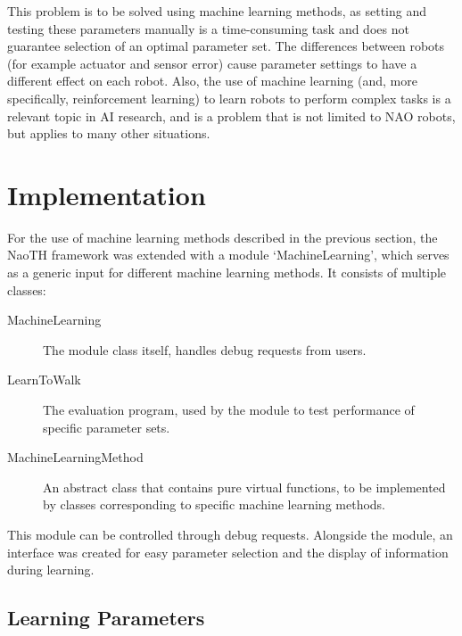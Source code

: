 \documentclass{article}
\begin{document}
This problem is to be solved using machine learning methods, as setting and testing these parameters manually is a time-consuming task and does not guarantee selection of an optimal parameter set. The differences between robots (for example actuator and sensor error) cause parameter settings to have a different effect on each robot. Also, the use of machine learning (and, more specifically, reinforcement learning) to learn robots to perform complex tasks is a relevant topic in AI research, and is a problem that is not limited to NAO robots, but applies to many other situations. 


\section{Implementation}
For the use of machine learning methods described in the previous section, the NaoTH framework was extended with a module `MachineLearning', which serves as a generic input for different machine learning methods. It consists of multiple classes:

\begin{description}
\item[MachineLearning] The module class itself, handles debug requests from users.
\item[LearnToWalk] The evaluation program, used by the module to test performance of specific parameter sets.
\item[MachineLearningMethod] An abstract class that contains pure virtual functions, to be implemented by classes corresponding to specific machine learning methods.
\end{description}

This module can be controlled through debug requests. Alongside the module, an interface was created for easy parameter selection and the display of information during learning.

\subsection{Learning Parameters}
\end{document}
